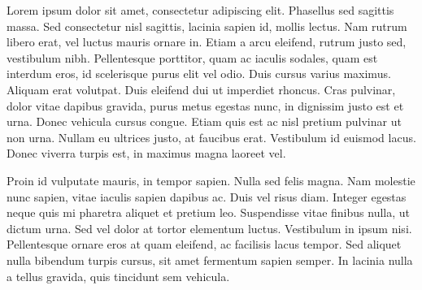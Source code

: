 
\begin{enAbstract}

    Lorem ipsum dolor sit amet, consectetur adipiscing elit. Phasellus sed sagittis massa. Sed consectetur nisl sagittis, lacinia sapien id, mollis lectus. Nam rutrum libero erat, vel luctus mauris ornare in. Etiam a arcu eleifend, rutrum justo sed, vestibulum nibh. Pellentesque porttitor, quam ac iaculis sodales, quam est interdum eros, id scelerisque purus elit vel odio. Duis cursus varius maximus. Aliquam erat volutpat. Duis eleifend dui ut imperdiet rhoncus. Cras pulvinar, dolor vitae dapibus gravida, purus metus egestas nunc, in dignissim justo est et urna. Donec vehicula cursus congue. Etiam quis est ac nisl pretium pulvinar ut non urna. Nullam eu ultrices justo, at faucibus erat. Vestibulum id euismod lacus. Donec viverra turpis est, in maximus magna laoreet vel.

    Proin id vulputate mauris, in tempor sapien. Nulla sed felis magna. Nam molestie nunc sapien, vitae iaculis sapien dapibus ac. Duis vel risus diam. Integer egestas neque quis mi pharetra aliquet et pretium leo. Suspendisse vitae finibus nulla, ut dictum urna. Sed vel dolor at tortor elementum luctus. Vestibulum in ipsum nisi. Pellentesque ornare eros at quam eleifend, ac facilisis lacus tempor. Sed aliquet nulla bibendum turpis cursus, sit amet fermentum sapien semper. In lacinia nulla a tellus gravida, quis tincidunt sem vehicula.

    \enAbsKeywords
\end{enAbstract}
